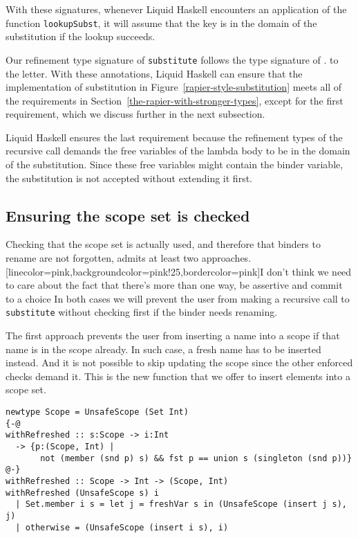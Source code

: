 \documentclass[sigconf, anonymous, review]{acmart}
\newcommand{\improvement}[1]{\todo[linecolor=pink,backgroundcolor=pink!25,bordercolor=pink]{#1}}
\renewcommand{\todo}{}
\newcommand{\improvement}[1]{{}}
\newcommand{\tc}[1]{{\small\texttt{#1}}}
\begin{document}
With these signatures, whenever Liquid Haskell encounters an application
of the function \tc{lookupSubst}, it will assume that the key is in the domain
of the substitution if the lookup succeeds.

Our refinement type signature of \tc{substitute} follows the type signature of
\citeauthor{maclaurin23}. to the letter. With these annotations, Liquid Haskell can ensure that the
implementation of substitution in Figure~\ref{rapier-style-substitution} meets
all of the requirements in Section~\ref{the-rapier-with-stronger-types}, except
for the first requirement, which we discuss further in the next subsection.

Liquid Haskell ensures the last requirement because the
refinement types of the recursive call demands the free variables of the lambda
body to be in the domain of the substitution. Since these free variables might
contain the binder variable, the substitution is not accepted without extending
it first.

\subsection{Ensuring the scope set is checked}
\label{ensuring-the-scope-set-is-checked}

Checking that the scope set is actually used, and therefore that binders to rename
are not forgotten, admits at least two approaches.\improvement{I don't think we
  need to care about the fact that there's more than one way, be assertive and
  commit to a choice} In both cases we will prevent
the user from making a recursive call to \tc{substitute} without checking first
if the binder needs renaming.

The first approach prevents the user from inserting a name into a scope if that
name is in the scope already. In such case, a fresh name has to be inserted instead.
And it is not possible to skip updating the scope since the other enforced checks
demand it. This is the new function that we offer to insert elements into a scope
set.

\begin{verbatim}
newtype Scope = UnsafeScope (Set Int)
{-@
withRefreshed :: s:Scope -> i:Int
  -> {p:(Scope, Int) |
       not (member (snd p) s) && fst p == union s (singleton (snd p))}
@-}
withRefreshed :: Scope -> Int -> (Scope, Int)
withRefreshed (UnsafeScope s) i
  | Set.member i s = let j = freshVar s in (UnsafeScope (insert j s), j)
  | otherwise = (UnsafeScope (insert i s), i)
\end{verbatim}
\end{document}
